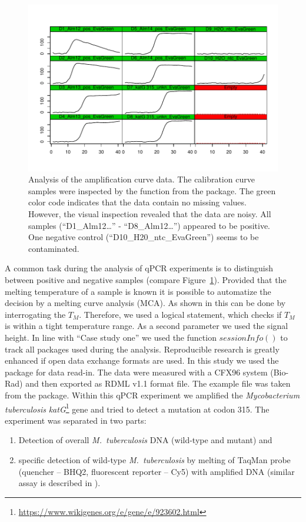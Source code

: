 \begin{figure}[htbp]
  \centering
  \includegraphics[clip=true, width=14cm]{figures/plotCurves.pdf}
  \caption{Analysis of the amplification curve data. The calibration curve 
samples were inspected by the  function from the 
 package. The green color code indicates that the data contain 
no missing values. However, the visual inspection revealed that the data are 
noisy. All samples (``D1\_Alm12\ldots'' - ``D8\_Alm12\ldots'') appeared to be 
positive. One negative control (``D10\_H20\_ntc\_EvaGreen'') seems to be 
contaminated.}
  \label{figure:plotCurves}
\end{figure}


A common task during the analysis of qPCR experiments is to distinguish between 
positive and negative samples (compare Figure~\ref{figure:plotCurves}). Provided 
that the melting temperature of a sample is known it is possible to automatize 
the decision by a melting curve analysis (MCA). As shown in 
\citet{roediger_RJ_2013} this can be done by interrogating the $T_{M}$. 
Therefore, we used a logical statement, which checks if $T_{M}$ is within a 
tight temperature range. As a second parameter we used the signal height. In 
line with ``Case study one'' we used the function $sessionInfo()$ to track all 
packages used during the analysis. Reproducible research is greatly enhanced if 
open data exchange formats are used. In this study we used the  
package for data read-in. The data were measured with a CFX96 system (Bio-Rad) 
and then exported as RDML v1.1 format file. The example file 
 was taken from the  package. Within 
this qPCR experiment we amplified the \textit{Mycobacterium tuberculosis} 
\textit{katG}\footnote{\url{https://www.wikigenes.org/e/gene/e/923602.html}} 
gene and tried to detect a mutation at codon 315. The experiment was separated 
in two parts: 
\begin{enumerate}
 \item Detection of overall \textit{M.~tuberculosis} DNA (wild-type 
and mutant) and
 \item specific detection of wild-type \textit{M.~tuberculosis} by melting of 
TaqMan probe (quencher -- BHQ2, fluorescent reporter -- Cy5) with amplified DNA 
(similar assay is described in \citet{luo_multiplex_2011}).
\end{enumerate}


